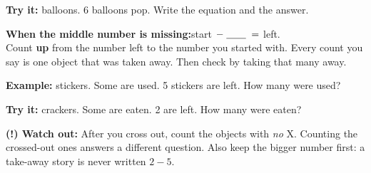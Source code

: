 \documentclass[12pt]{article}
\begin{document}
\begin{tryitbox}
\textbf{Try it:} balloons. 6 balloons pop. Write the equation and the answer.\\[2pt]
\end{tryitbox}


\begin{formulabox}
\textbf{When the middle number is missing:}\quad start $-\;\underline{\hspace{0.7cm}}\; =$ left.\\[3pt]
Count \textbf{up} from the number left to the number you started with. Every count you say is one object
that was taken away. Then check by taking that many away.
\end{formulabox}

\begin{examplebox}
\textbf{Example:} stickers. Some are used. 5 stickers are left. How many were used?
\end{examplebox}

\begin{tryitbox}
\textbf{Try it:} crackers. Some are eaten. 2 are left. How many were eaten?\\[2pt]
\end{tryitbox}

\begin{watchoutbox}
\textbf{(!) Watch out:} After you cross out, count the objects with \emph{no} X.
Counting the crossed-out ones answers a different question.
Also keep the bigger number first: a take-away story is never written $2 - 5$.
\end{watchoutbox}
\end{document}
